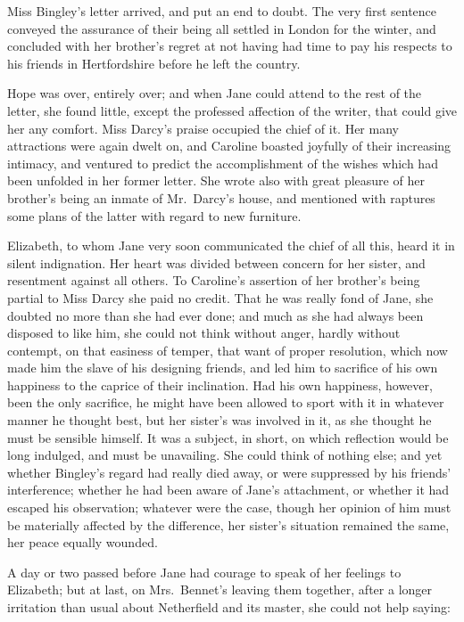 \documentclass[12pt,english,oneside]{book}
\begin{document}
Miss Bingley's letter arrived, and put an end to doubt. The very first
sentence conveyed the assurance of their being all settled in London
for the winter, and concluded with her brother's regret at not having
had time to pay his respects to his friends in Hertfordshire before
he left the country.

Hope was over, entirely over; and when Jane could attend to the rest
of the letter, she found little, except the professed affection of
the writer, that could give her any comfort. Miss Darcy's praise occupied
the chief of it. Her many attractions were again dwelt on, and Caroline
boasted joyfully of their increasing intimacy, and ventured to predict
the accomplishment of the wishes which had been unfolded in her former
letter. She wrote also with great pleasure of her brother's being
an inmate of Mr.\ Darcy's house, and mentioned with raptures some
plans of the latter with regard to new furniture.

Elizabeth, to whom Jane very soon communicated the chief of all this,
heard it in silent indignation. Her heart was divided between concern
for her sister, and resentment against all others. To Caroline's assertion
of her brother's being partial to Miss Darcy she paid no credit. That
he was really fond of Jane, she doubted no more than she had ever
done; and much as she had always been disposed to like him, she could
not think without anger, hardly without contempt, on that easiness
of temper, that want of proper resolution, which now made him the
slave of his designing friends, and led him to sacrifice of his own
happiness to the caprice of their inclination. Had his own happiness,
however, been the only sacrifice, he might have been allowed to sport
with it in whatever manner he thought best, but her sister's was involved
in it, as she thought he must be sensible himself. It was a subject,
in short, on which reflection would be long indulged, and must be
unavailing. She could think of nothing else; and yet whether Bingley's
regard had really died away, or were suppressed by his friends' interference;
whether he had been aware of Jane's attachment, or whether it had
escaped his observation; whatever were the case, though her opinion
of him must be materially affected by the difference, her sister's
situation remained the same, her peace equally wounded.

A day or two passed before Jane had courage to speak of her feelings
to Elizabeth; but at last, on Mrs.\ Bennet's leaving them together,
after a longer irritation than usual about Netherfield and its master,
she could not help saying:
\end{document}
